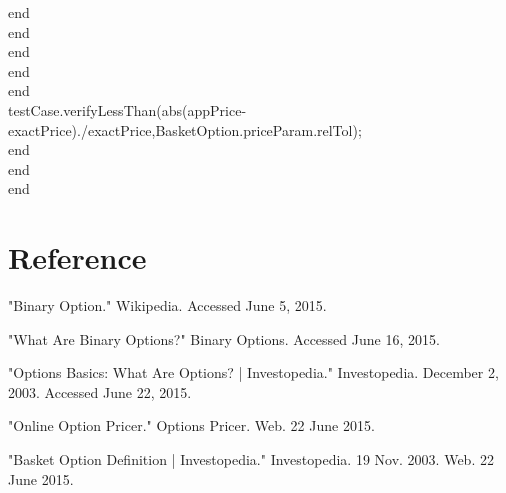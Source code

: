 \documentclass[]{elsarticle}
\theoremstyle{definition}
\theoremstyle{remark}
\begin{document}
                              end\\
                          end\\
                      end\\
                  end\\
              end\\
              testCase.verifyLessThan(abs(appPrice-exactPrice)./exactPrice,BasketOption.priceParam.relTol);\\
          end\\
     end\\
  end \\

\section*{Reference}
"Binary Option." Wikipedia. Accessed June 5, 2015.

"What Are Binary Options?" Binary Options. Accessed June 16, 2015.

"Options Basics: What Are Options? | Investopedia." Investopedia. December 2, 2003. Accessed June 22, 2015.

"Online Option Pricer." Options Pricer. Web. 22 June 2015.

"Basket Option Definition | Investopedia." Investopedia. 19 Nov. 2003. Web. 22 June 2015.
\end{document}
